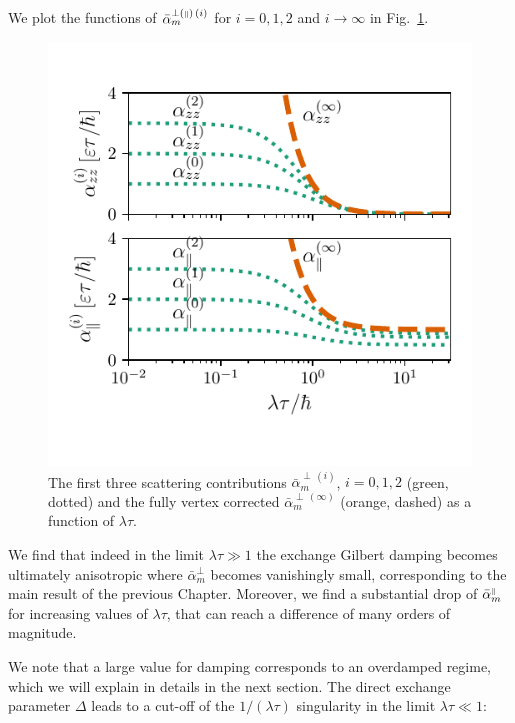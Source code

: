 We plot the functions of $\bar{\alpha}_{m}^{\perp({\scriptscriptstyle\parallel})\,(i)}$ for $i=0,1,2$ and $i\rightarrow\infty$ in Fig.~\ref{fig:alpha_plot}. 
\begin{figure}
    \centering
    \includegraphics[width=0.75\linewidth]{gfx/Chapter04/alpha_plot2}
    \caption{The first three scattering contributions $\bar{\alpha}_{m}^{\perp\,(i)}$, $i=0,1,2$ (green, dotted) and the fully vertex corrected $\bar{\alpha}_{m}^{\perp\,(\infty)}$ (orange, dashed) as a function of $\lambda \tau$. }
    \label{fig:alpha_plot}
\end{figure}

We find that indeed in the limit $\lambda\tau\gg1$ the exchange Gilbert damping becomes ultimately anisotropic where $\bar{\alpha}_{m}^{\perp}$ becomes vanishingly small, corresponding to the main result of the previous Chapter. Moreover, we find a substantial drop of $\bar{\alpha}_{m}^{{\scriptscriptstyle\parallel}}$ for increasing values of $\lambda\tau$, that can reach a difference of many orders of magnitude. 

We note that a large value for damping corresponds to an overdamped regime, which we will explain in details in the next section. The direct exchange parameter $\Delta$ leads to a cut-off of the $1/(\lambda\tau)$ singularity in the limit $\lambda\tau\ll1$:

